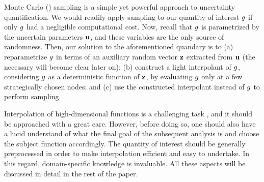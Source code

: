 Monte Carlo () sampling is a simple yet powerful approach to
uncertainty quantification. We would readily apply  sampling to our
quantity of interest $g$ if only $g$ had a negligible computational cost. Now,
recall that $g$ is parametrized by the uncertain parameters $\mathbf{u}$, and these
variables are the only source of randomness. Then, our solution to the
aforementioned quandary is to (a) reparametrize $g$ in terms of an auxiliary
random vector $\mathbf{z}$ extracted from $\mathbf{u}$ (the necessary will become clear later
on); (b) construct a light interpolant of $g$, considering $g$ as a
deterministic function of $\mathbf{z}$, by evaluating $g$ only at a few strategically
chosen nodes; and (c) use the constructed interpolant instead of $g$ to perform
 sampling.

Interpolation of high-dimensional functions is a challenging task \perse, and it
should be approached with a great care. However, before doing so, one should
also have a lucid understand of what the final goal of the subsequent analysis
is and choose the subject function accordingly. The quantity of interest should
be generally preprocessed in order to make interpolation efficient and easy to
undertake. In this regard, domain-specific knowledge is invaluable. All these
aspects will be discussed in detail in the rest of the paper.
